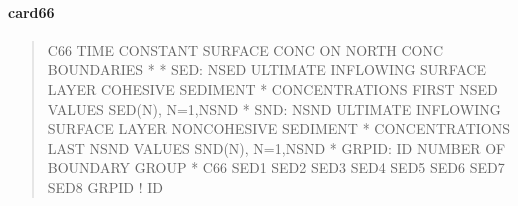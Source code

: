 \documentclass[letterpaper,10pt,english]{sphinxmanual}
\begin{document}
\paragraph{card66}
\label{\detokenize{inputfiles/runcontrol/card66:card66}}\label{\detokenize{inputfiles/runcontrol/card66::doc}}\begin{quote}

\begin{sphinxVerbatim}[commandchars=\\\{\}]
\PYGZhy{}\PYGZhy{}\PYGZhy{}\PYGZhy{}\PYGZhy{}\PYGZhy{}\PYGZhy{}\PYGZhy{}\PYGZhy{}\PYGZhy{}\PYGZhy{}\PYGZhy{}\PYGZhy{}\PYGZhy{}\PYGZhy{}\PYGZhy{}\PYGZhy{}\PYGZhy{}\PYGZhy{}\PYGZhy{}\PYGZhy{}\PYGZhy{}\PYGZhy{}\PYGZhy{}\PYGZhy{}\PYGZhy{}\PYGZhy{}\PYGZhy{}\PYGZhy{}\PYGZhy{}\PYGZhy{}\PYGZhy{}\PYGZhy{}\PYGZhy{}\PYGZhy{}\PYGZhy{}\PYGZhy{}\PYGZhy{}\PYGZhy{}\PYGZhy{}\PYGZhy{}\PYGZhy{}\PYGZhy{}\PYGZhy{}\PYGZhy{}\PYGZhy{}\PYGZhy{}\PYGZhy{}\PYGZhy{}\PYGZhy{}\PYGZhy{}\PYGZhy{}\PYGZhy{}\PYGZhy{}\PYGZhy{}\PYGZhy{}\PYGZhy{}\PYGZhy{}\PYGZhy{}\PYGZhy{}\PYGZhy{}\PYGZhy{}\PYGZhy{}\PYGZhy{}\PYGZhy{}\PYGZhy{}\PYGZhy{}\PYGZhy{}\PYGZhy{}\PYGZhy{}\PYGZhy{}\PYGZhy{}\PYGZhy{}\PYGZhy{}\PYGZhy{}\PYGZhy{}\PYGZhy{}\PYGZhy{}
C66 TIME CONSTANT SURFACE CONC ON NORTH CONC BOUNDARIES
*
*    SED: NSED ULTIMATE INFLOWING SURFACE LAYER COHESIVE SEDIMENT
*         CONCENTRATIONS  FIRST NSED VALUES SED(N), N=1,NSND
*    SND: NSND ULTIMATE INFLOWING SURFACE LAYER NON\PYGZhy{}COHESIVE SEDIMENT
*         CONCENTRATIONS LAST NSND VALUES SND(N), N=1,NSND
*  GRPID: ID NUMBER OF BOUNDARY GROUP
*
C66      SED1      SED2      SED3      SED4      SED5      SED6      SED7      SED8      GRPID ! ID 
\end{sphinxVerbatim}
\end{quote}
\end{document}
